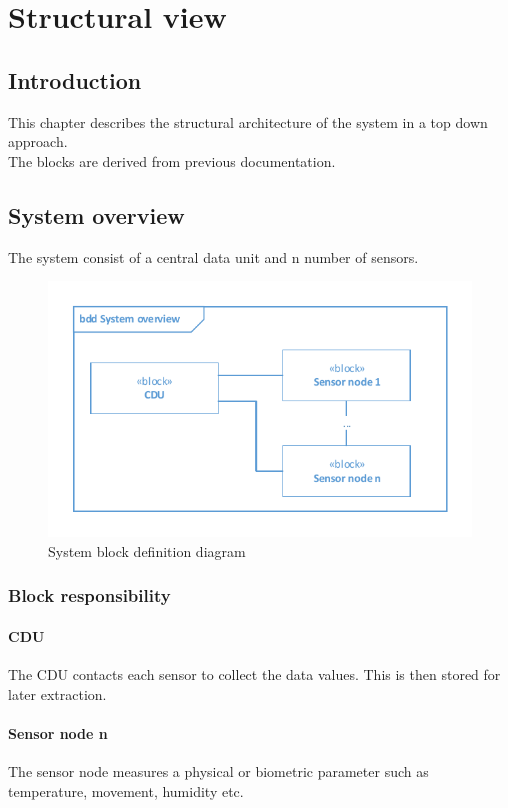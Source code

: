 \chapter{Structural view}

\section{Introduction}
This chapter describes the structural architecture of the system in a top down approach.\\
The blocks are derived from previous documentation.


\section{System overview}
The system consist of a central data unit and n number of sensors.
\begin{figure}[hbpt]
\centering
\includegraphics[width=.9\textwidth]{billeder/systembdd}
\caption{System block definition diagram}
\label{systembdd}
\end{figure}

\subsection{Block responsibility}
\subsubsection{CDU}
The CDU contacts each sensor to collect the data values. This is then stored for later extraction.

\subsubsection{Sensor node n}
The sensor node measures a physical or biometric parameter such as temperature, movement, humidity etc.

